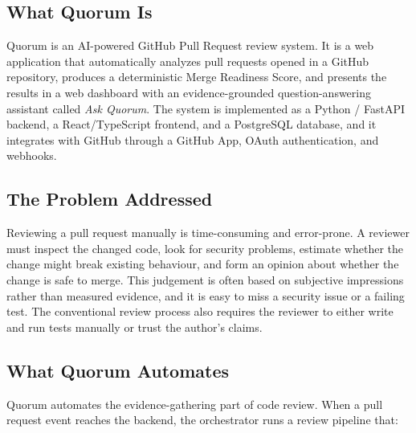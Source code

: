 \subsection{What Quorum Is}

Quorum is an AI-powered GitHub Pull Request review system. It is a web
application that automatically analyzes pull requests opened in a GitHub
repository, produces a deterministic Merge Readiness Score, and presents the
results in a web dashboard with an evidence-grounded question-answering
assistant called \emph{Ask Quorum}. The system is implemented as a Python /
FastAPI backend, a React/TypeScript frontend, and a PostgreSQL database, and
it integrates with GitHub through a GitHub App, OAuth authentication, and
webhooks.

\subsection{The Problem Addressed}

Reviewing a pull request manually is time-consuming and error-prone. A
reviewer must inspect the changed code, look for security problems, estimate
whether the change might break existing behaviour, and form an opinion about
whether the change is safe to merge. This judgement is often based on
subjective impressions rather than measured evidence, and it is easy to miss
a security issue or a failing test. The conventional review process also
requires the reviewer to either write and run tests manually or trust the
author's claims.

\subsection{What Quorum Automates}

Quorum automates the evidence-gathering part of code review. When a pull
request event reaches the backend, the orchestrator runs a review pipeline
that:

